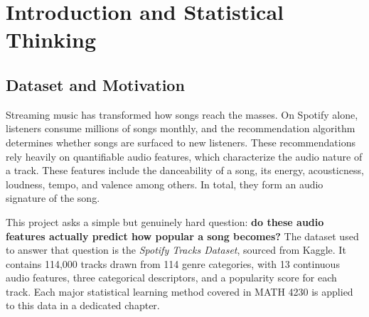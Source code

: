 \documentclass[12pt, oneside]{book}
\begin{document}
\tableofcontents

\listoffigures

\listoftables

\mainmatter


\chapter{Introduction and Statistical Thinking}

\section{Dataset and Motivation}

Streaming music has transformed how songs reach the masses. On Spotify alone, listeners consume millions of songs monthly, and the recommendation algorithm determines whether songs are surfaced to new listeners. These recommendations rely heavily on quantifiable audio features, which characterize the audio nature of a track. These features include the danceability of a song, its energy, acousticness, loudness, tempo, and valence among others. In total, they form an audio signature of the song.

This project asks a simple but genuinely hard question: \textbf{do these audio features actually predict how popular a song becomes?} The dataset used to answer that question is the \textit{Spotify Tracks Dataset}, sourced from Kaggle. It contains 114{,}000 tracks drawn from 114 genre categories, with 13 continuous audio features, three categorical descriptors, and a popularity score for each track. Each major statistical learning method covered in MATH 4230 is applied to this data in a dedicated chapter.
\end{document}
